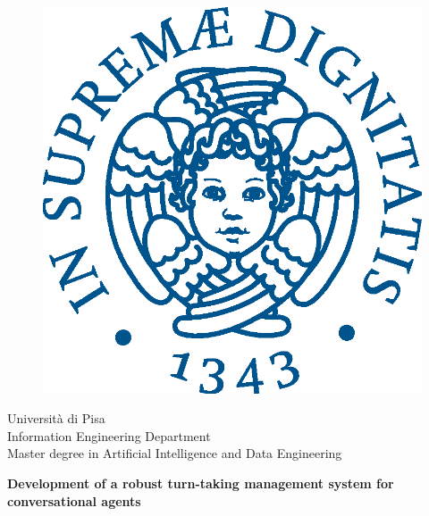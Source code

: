 \documentclass[../main.tex]{subfiles}
\begin{document}
\begin{titlepage}
    \begin{figure}[ht]
        \centering
        \includegraphics[keepaspectratio=true,scale=0.4]{images/cherubinFrontespizio.eps}
    \end{figure}
    
    \begin{center}
        \doublespacing
        \LARGE{Università di Pisa}\\
        \large{Information Engineering Department}\\
        \large{Master degree in Artificial Intelligence and Data Engineering}\\  
    \end{center}

    \vspace{15mm}

    \begin{center}
        \large{\textbf{Development of a robust turn-taking management system for conversational agents}}\\
    \end{center}
    

\end{titlepage}
\end{document}
